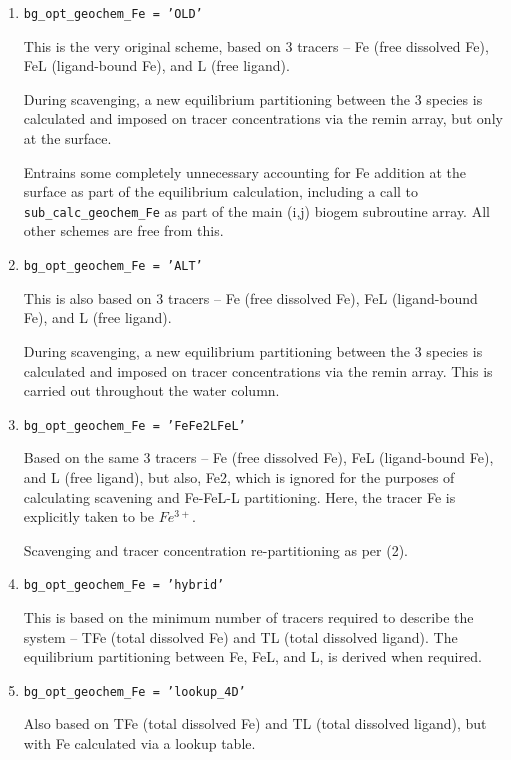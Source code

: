 \documentclass[11pt,fleqn]{book} %
\begin{document}
\begin{enumerate}[noitemsep]
\setlength{\itemindent}{.2in}

\item \texttt{bg\_opt\_geochem\_Fe = 'OLD'}

This is the very original scheme, based on 3 tracers -- Fe (free dissolved Fe), FeL (ligand-bound Fe), and L (free ligand).

During scavenging, a new equilibrium partitioning between the 3 species is calculated and imposed on tracer concentrations via the remin array, but only at the surface.

Entrains some completely unnecessary accounting for Fe addition at the surface as part of the equilibrium calculation, including a call to \texttt{sub\_calc\_geochem\_Fe} as part of the main (i,j) biogem subroutine array. All other schemes are free from this.

\item \texttt{bg\_opt\_geochem\_Fe = 'ALT'}

This is also based on 3 tracers -- Fe (free dissolved Fe), FeL (ligand-bound Fe), and L (free ligand).

During scavenging, a new equilibrium partitioning between the 3 species is calculated and imposed on tracer concentrations via the remin array. This is carried out throughout the water column.

\item \texttt{bg\_opt\_geochem\_Fe = 'FeFe2LFeL'}

Based on the same 3 tracers -- Fe (free dissolved Fe), FeL (ligand-bound Fe), and L (free ligand),  but also, Fe2, which is ignored for the purposes of calculating scavening and Fe-FeL-L partitioning. Here, the tracer Fe is explicitly taken to be \(Fe^{3+}\).

Scavenging and tracer concentration re-partitioning as per (2).

\item \texttt{bg\_opt\_geochem\_Fe = 'hybrid'}

This is based on the minimum  number of tracers required to describe the system -- TFe (total dissolved Fe) and TL (total dissolved ligand). The equilibrium partitioning between Fe, FeL, and L, is derived when required.

\item \texttt{bg\_opt\_geochem\_Fe = 'lookup\_4D'}

Also based on TFe (total dissolved Fe) and TL (total dissolved ligand), but with Fe calculated via a lookup table.

\end{enumerate}
\end{document}
